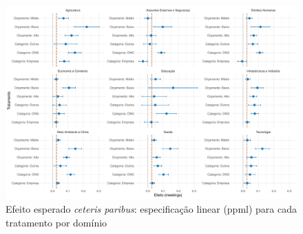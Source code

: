 

\begin{landscape}
\thispagestyle{plain}
\begin{figure}[p]
    \centering
    \includegraphics[width=1.2
    \textwidth]{figures/fig_coeff_treatments_by_domain.pdf}
    \caption{Efeito esperado \textit{ceteris paribus}: especificação linear (\acrshort{ppml}) para cada tratamento por domínio} 
    \label{fig:effect_linear_ppml_treatments_by_domain}
\end{figure}
\end{landscape}


